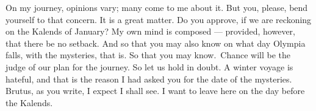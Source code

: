 

 On my journey, opinions vary; many come to me about it. But you, please, bend yourself to that concern. It is a great matter. Do you approve, if we are reckoning on the Kalends of January? My own mind is composed --- provided, however, that there be no setback. \dag And so that you may also know on what day Olympia falls, with the mysteries, that is. So that you may know.\dag\ Chance will be the judge of our plan for the journey. So let us hold in doubt. A winter voyage is hateful, and that is the reason I had asked you for the date of the mysteries. Brutus, as you write, I expect I shall see. I want to leave here on the day before the Kalends.

